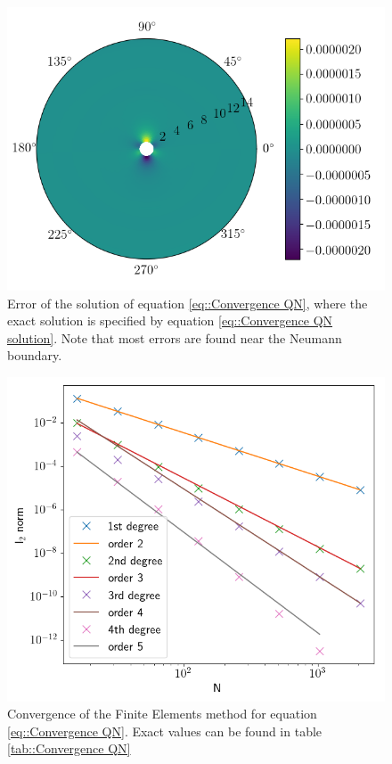 \begin{figure}[h]
 \centering
 \includegraphics[width=.65\textwidth]{Figs/PoissonConvergence/Error.png}
 \caption{\label{fig::Convergence QN Error} Error of the solution of equation \ref{eq::Convergence QN}, where the exact solution is specified by equation \ref{eq::Convergence QN solution}. Note that most errors are found near the Neumann boundary.}
\end{figure}

\begin{figure}[h]
 \centering
 \includegraphics[width=.69\textwidth]{Figs/PoissonConvergence/l2_elementwise.png}
 \vspace{-1em}
 \caption{\label{fig::Convergence QN} Convergence of the Finite Elements method for equation \ref{eq::Convergence QN}. Exact values can be found in table \ref{tab::Convergence QN}}
\end{figure}
